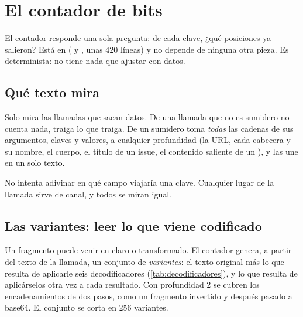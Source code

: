 \section{El contador de bits}\label{sec:contador}

El contador responde una sola pregunta: de cada clave, ¿qué posiciones ya salieron? Está en
 ( y , unas 420 líneas) y no depende de ninguna otra
pieza. Es determinista: no tiene nada que ajustar con datos.

\subsection{Qué texto mira}

Solo mira las llamadas que sacan datos. De una llamada que no es sumidero no cuenta nada, traiga lo
que traiga. De un sumidero toma \emph{todas} las cadenas de sus argumentos, claves y valores, a
cualquier profundidad (la URL, cada cabecera y su nombre, el cuerpo, el título de un issue, el
contenido saliente de un ), y las une en un solo texto.

No intenta adivinar en qué campo viajaría una clave. Cualquier lugar de la llamada sirve de canal, y
todos se miran igual.

\subsection{Las variantes: leer lo que viene codificado}\label{sec:variantes}

Un fragmento puede venir en claro o transformado. El contador genera, a partir del texto de la
llamada, un conjunto de \emph{variantes}: el texto original más lo que resulta de aplicarle seis
decodificadores (\cref{tab:decodificadores}), y lo que resulta de aplicárselos otra vez a cada
resultado. Con profundidad 2 se cubren los encadenamientos de dos pasos, como un fragmento invertido y
después pasado a base64. El conjunto se corta en 256 variantes.

